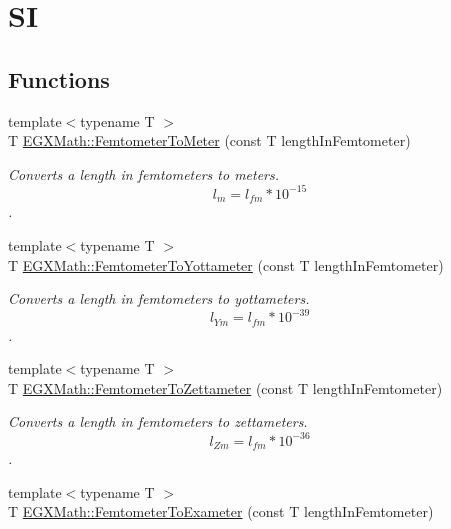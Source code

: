 \hypertarget{group___e_g_x_math-_conversions-_length_conversions-_femtometer-_s_i}{}\section{SI}
\label{group___e_g_x_math-_conversions-_length_conversions-_femtometer-_s_i}
\subsection*{Functions}
\begin{DoxyCompactItemize}
\item 
{\footnotesize template$<$typename T $>$ }\\T \mbox{\hyperlink{group___e_g_x_math-_conversions-_length_conversions-_femtometer-_s_i_gad0ac4ef551ee703c8952fe04fbd90f78}{E\+G\+X\+Math\+::\+Femtometer\+To\+Meter}} (const T length\+In\+Femtometer)
\begin{DoxyCompactList}\small\item\em Converts a length in femtometers to meters. \[ l_{m}=l_{fm} * 10^{-15} \]. \end{DoxyCompactList}\item 
{\footnotesize template$<$typename T $>$ }\\T \mbox{\hyperlink{group___e_g_x_math-_conversions-_length_conversions-_femtometer-_s_i_gabee380e1753dab5aa9aa433b8f3ce4d4}{E\+G\+X\+Math\+::\+Femtometer\+To\+Yottameter}} (const T length\+In\+Femtometer)
\begin{DoxyCompactList}\small\item\em Converts a length in femtometers to yottameters. \[ l_{Ym}=l_{fm} * 10^{-39} \]. \end{DoxyCompactList}\item 
{\footnotesize template$<$typename T $>$ }\\T \mbox{\hyperlink{group___e_g_x_math-_conversions-_length_conversions-_femtometer-_s_i_ga4906b22484dc1005dd962a943a967b50}{E\+G\+X\+Math\+::\+Femtometer\+To\+Zettameter}} (const T length\+In\+Femtometer)
\begin{DoxyCompactList}\small\item\em Converts a length in femtometers to zettameters. \[ l_{Zm}=l_{fm} * 10^{-36} \]. \end{DoxyCompactList}\item 
{\footnotesize template$<$typename T $>$ }\\T \mbox{\hyperlink{group___e_g_x_math-_conversions-_length_conversions-_femtometer-_s_i_ga44f78ba3f928c765acf6330b47ab3827}{E\+G\+X\+Math\+::\+Femtometer\+To\+Exameter}} (const T length\+In\+Femtometer)

\end{DoxyCompactItemize}
